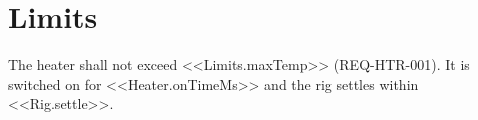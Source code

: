 \section{Limits}

The heater shall not exceed <<Limits.maxTemp>> (REQ-HTR-001).
It is switched on for <<Heater.onTimeMs>> and the rig settles within <<Rig.settle>>.

\newcommand{\maxtemp}{<<Limits.maxTemp|value>>}
